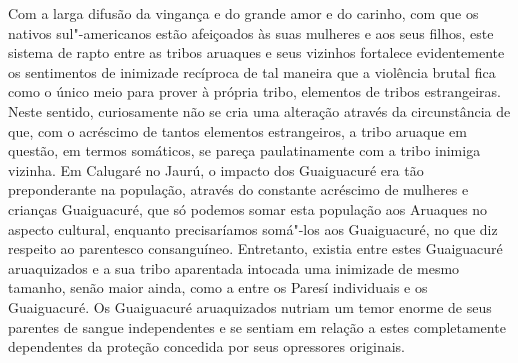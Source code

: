 Com a larga difusão da vingança e do grande amor e do carinho, com que
os nativos 
sul"-americanos estão afeiçoados às suas mulheres e aos seus filhos, este sistema de rapto entre as tribos aruaques e seus vizinhos fortalece evidentemente os sentimentos de inimizade recíproca de tal
maneira que a violência brutal fica como o único meio para prover à
própria tribo, elementos de tribos estrangeiras. Neste sentido,
curiosamente não se cria uma alteração através da circunstância de que,
com o acréscimo de tantos elementos estrangeiros, a tribo aruaque em
questão, em termos somáticos, se pareça paulatinamente com a tribo
inimiga vizinha. Em Calugaré no Jaurú, o impacto dos Guaiguacuré era tão
preponderante na população, através do constante acréscimo de mulheres e
crianças Guaiguacuré, que só podemos somar esta população aos Aruaques no
aspecto cultural, enquanto precisaríamos somá"-los aos Guaiguacuré, no
que diz respeito ao parentesco consanguíneo. Entretanto, existia entre
estes Guaiguacuré aruaquizados e a sua tribo aparentada intocada uma
inimizade de mesmo tamanho, senão maior ainda, como a entre os Paresí
individuais e os Guaiguacuré. Os Guaiguacuré aruaquizados nutriam um
temor enorme de seus parentes de sangue independentes e se sentiam em
relação a estes completamente dependentes da proteção concedida por seus
opressores originais.

